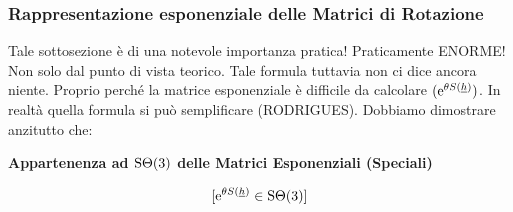 \subsubsection{Rappresentazione esponenziale delle Matrici di Rotazione}

Tale sottosezione è di una notevole importanza pratica! Praticamente ENORME! Non solo dal punto di vista teorico. Tale formula tuttavia non ci dice ancora niente. Proprio perché la matrice esponenziale è difficile da calcolare $(\mathop{}\!\mathrm{e}^{\theta S(\underline{h})})$. In realtà quella formula si può semplificare (RODRIGUES). Dobbiamo dimostrare anzitutto che:

\begin{thrm}{\textbf{Appartenenza ad $\operatorname{S\Theta}(3)$ delle Matrici Esponenziali (Speciali)}}

\[
	[\mathop{}\!\mathrm{e}^{\theta S(\underline{h})}\in\operatorname{S\Theta}(3)]
\]

\end{thrm}

